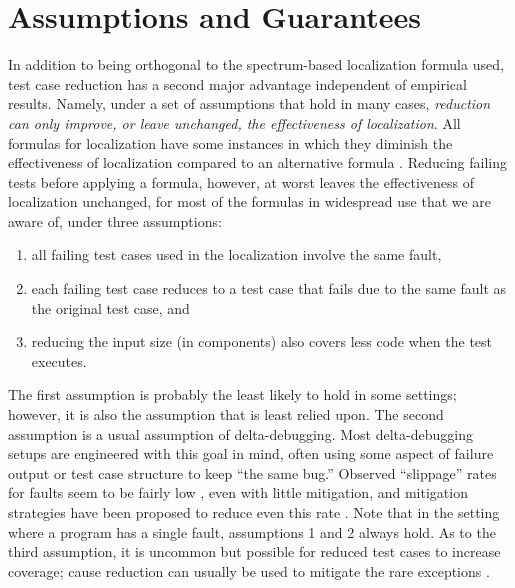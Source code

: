\section{Assumptions and Guarantees}
\label{formal}

In addition to being orthogonal to the spectrum-based localization
formula used, test case reduction has a second major advantage
independent of empirical results.  Namely, under a set of assumptions
that hold in many cases, \emph{reduction can only improve, or leave
unchanged, the effectiveness of localization}.  All formulas for
localization have some instances in which they diminish the
effectiveness of localization compared to an alternative formula
\cite{yoo2014no}. 
Reducing failing tests before applying a formula, however, at worst
leaves the effectiveness of localization unchanged, for most of the
formulas in widespread use that we are aware of, under three
assumptions:

\begin{enumerate}
\item all failing test cases used in the localization involve the same
fault,
\item each failing test case reduces to a test case that fails due to the same fault as the original test case, and
\item reducing the input size (in components) also covers less code when the test executes.
\end{enumerate}

The first assumption is probably the least likely to hold in some
settings; however, it is also the assumption that is least relied
upon. The second assumption is a usual assumption of delta-debugging.  Most
delta-debugging setups are engineered with this goal in mind, often
using some aspect of failure output or test case structure to keep
``the same bug.''  Observed ``slippage'' rates for faults
seem to be fairly low \cite{PLDI13}, even with little mitigation, and
mitigation strategies have been proposed to reduce even this rate \cite{slippageMit}.
Note that in the setting where a program has a single fault,
assumptions 1 and 2 always hold.  As to the third assumption, it is
uncommon but possible for reduced test cases to increase coverage;
cause reduction can usually be used to mitigate the rare exceptions \cite{icst14}.

